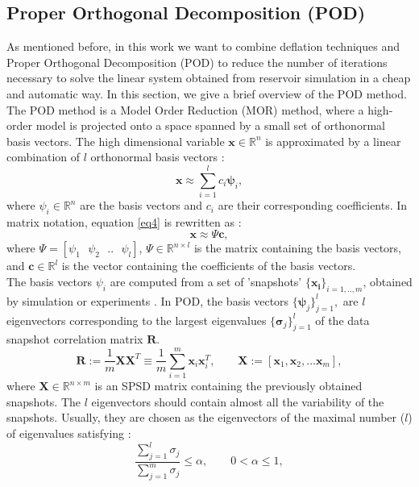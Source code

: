 \documentclass[12pt]{article}
\begin{document}
\subsection{Proper Orthogonal Decomposition (POD)}\label{POD}
As mentioned before, in this work we want to combine deflation techniques and Proper Orthogonal Decomposition (POD) to reduce the number of iterations necessary to solve the linear system obtained from reservoir simulation in a cheap and automatic way. In this section, we give a brief overview of the POD method.\\
The POD method is a Model Order Reduction (MOR) method, where a high-order model is projected onto a space
spanned by a small set of orthonormal basis vectors.
The high dimensional variable $\mathbf{x} \in \mathbb{R}^n$
is approximated by a linear combination of $l$ orthonormal basis vectors \cite{Astrid11}:
\begin{equation}\label{eq4}
  \mathbf{x}\approx \sum_{i=1}^lc_i \mathbf{\psi}_i,
\end{equation}
where $\psi_i \in \mathbb{R}^n$ are the basis vectors and $c_i$ are their corresponding coefficients.
In matrix notation, equation \eqref{eq4} is rewritten as :
$$\mathbf{x}\approx \Psi\mathbf{c},$$
where $\Psi=[\psi_1 \text{ }\psi_2 \text{ }.. \text{ }\psi_l]$, $\Psi \in \mathbb{R}^{n\times l}$ 
is the matrix containing the basis vectors, and $\mathbf{c} \in \mathbb{R}^l$ is the vector 
containing the coefficients of the basis vectors. \\
The basis vectors $\psi_i$ are computed from a set of 'snapshots' $\{ \mathbf{x_i}\} _{i=1,..,m}$, 
obtained by simulation or experiments \cite{Mark06}. 
In POD, the basis vectors $\{ \mathbf{\psi} _j \} ^l _{j=1},$ are $l$ eigenvectors corresponding to 
the largest eigenvalues $\{ \mathbf{\sigma} _j \} ^l _{j=1}$ of the data snapshot correlation matrix $\mathbf{R}$.
\begin{equation}\label{eq:POD}
\mathbf{R}:= \frac{1}{m}\mathbf{X}\mathbf{X}^T \equiv \frac{1}{m} \sum_{i=1}^m \mathbf{x}_i \mathbf{x}_i^T,
\qquad \mathbf{X}:=[\mathbf{x}_1,\mathbf{x}_2,...\mathbf{x}_m],
\end{equation}
where $\mathbf{X}\in \mathbb{R}^{n\times m}$ is an SPSD matrix containing the previously obtained snapshots.
The $l$ eigenvectors should contain almost all the variability of the snapshots. 
Usually, they are chosen as the eigenvectors of the maximal number ($l$) of eigenvalues satisfying \cite{Mark06}:
\begin{equation}
\frac{\sum_{j=1}^l\sigma_j}{\sum_{j=1}^m\sigma_j}\leq \alpha, \qquad 0<\alpha \leq 1,
\end{equation}
\end{document}
